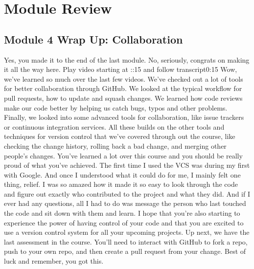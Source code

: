 \section{Module Review}

	\subsection{Module 4 Wrap Up: Collaboration}
	
	
	Yes, you made it to the end of the last module. No, seriously, congrats on making it all the way here.
	Play video starting at ::15 and follow transcript0:15
	Wow, we've learned so much over the last few videos. We've checked out a lot of tools for better collaboration through GitHub. We looked at the typical workflow for pull requests, how to update and squash changes. We learned how code reviews make our code better by helping us catch bugs, typos and other problems. Finally, we looked into some advanced tools for collaboration, like issue trackers or continuous integration services. All these builds on the other tools and techniques for version control that we've covered through out the course, like checking the change history, rolling back a bad change, and merging other people's changes. You've learned a lot over this course and you should be really proud of what you've achieved. The first time I used the VCS was during my first with Google. And once I understood what it could do for me, I mainly felt one thing, relief. I was so amazed how it made it so easy to look through the code and figure out exactly who contributed to the project and what they did. And if I ever had any questions, all I had to do was message the person who last touched the code and sit down with them and learn. I hope that you're also starting to experience the power of having control of your code and that you are excited to use a version control system for all your upcoming projects. Up next, we have the last assessment in the course. You'll need to interact with GitHub to fork a repo, push to your own repo, and then create a pull request from your change. Best of luck and remember, you got this.
